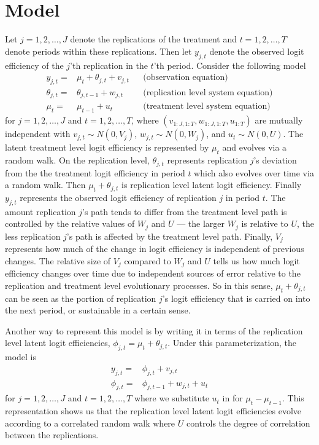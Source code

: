 \documentclass[graybox]{svmult}
\begin{document}
\section{Model}\label{sec:model}
Let $j=1,2,\dots,J$ denote the replications of the treatment and $t=1,2,\dots,T$ denote periods within these replications. Then let $y_{j,t}$ denote the observed logit efficiency of the $j$'th replication in the $t$'th period. Consider the following model   
\begin{align}
y_{j,t} =& \mu_t + \theta_{j,t} + v_{j,t}&&\mbox{(observation equation)} \nonumber\\
\theta_{j,t}=&\theta_{j,t-1} + w_{j,t}&&\mbox{(replication level system equation)}\nonumber\\
\mu_t=&\mu_{t-1} + u_t&&\mbox{(treatment level system equation)}\label{eq:hier}
\end{align}
for $j=1,2,\dots,J$ and $t=1,2,\dots,T$, where $(v_{1:J,1:T},w_{1:J,1:T},u_{1:T})$ are mutually independent with $v_{j,t}\sim N(0,V_j)$, $w_{j,t}\sim N(0,W_j)$, and $u_t\sim N(0,U)$. The latent treatment level logit efficiency is represented by $\mu_{t}$ and evolves via a random walk. On the replication level, $\theta_{j,t}$ represents replication $j$'s deviation from the the treatment logit efficiency in period $t$ which also evolves over time via a random walk. Then $\mu_t + \theta_{j,t}$ is replication level latent logit efficiency. Finally $y_{j,t}$ represents the observed logit efficiency of replication $j$ in period $t$. The amount replication $j$'s path tends to differ from the treatment level path is controlled by the relative values of $W_j$ and $U$ --- the larger $W_j$ is relative to $U$, the less replication $j$'s path is affected by the treatment level path. Finally, $V_j$ represents how much of the change in logit efficiency is independent of previous changes. The relative size of $V_{j}$ compared to $W_j$ and $U$ tells us how much logit efficiency changes over time due to independent sources of error relative to the replication and treatment level evolutionary processes. So in this sense, $\mu_t + \theta_{j,t}$ can be seen as the portion of replication $j$'s logit efficiency that is carried on into the next period, or sustainable in a certain sense.

Another way to represent this model is by writing it in terms of the replication level latent logit efficiencies, $\phi_{j,t}=\mu_t + \theta_{j,t}$. Under this parameterization, the model is
\begin{align}
y_{j,t} =& \phi_{j,t} + v_{j,t}\nonumber\\
\phi_{j,t}=&\phi_{j,t-1} + w_{j,t} + u_t \label{eq:notrt}
\end{align}
for $j=1,2,\dots,J$ and $t=1,2,\dots,T$ where we substitute $u_t$ in for $\mu_t - \mu_{t-1}$. This representation shows us that the replication level latent logit efficiencies evolve according to a correlated random walk where $U$ controls the degree of correlation between the replications. 
\end{document}
